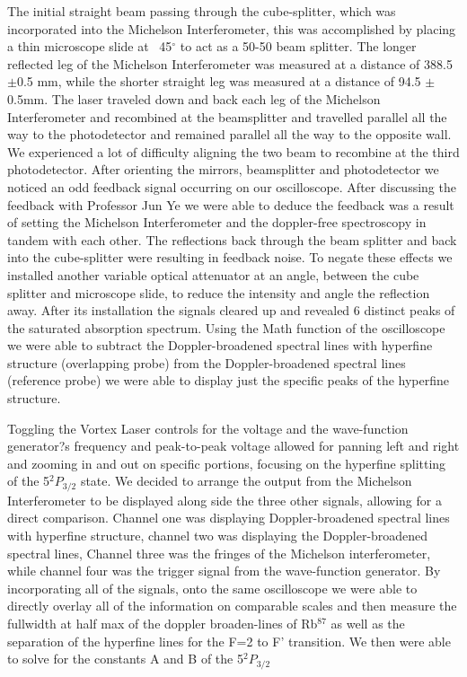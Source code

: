 \documentclass[12pt]{article}
\begin{document}
The initial straight beam passing through the cube-splitter, which was incorporated into the Michelson Interferometer, this was accomplished by placing a thin microscope slide at ~45$^{\circ}$ to act as a 50-50 beam splitter. The longer reflected leg of the Michelson Interferometer was measured at a distance of 388.5 $\pm $0.5 mm, while the shorter straight leg was measured at a distance of 94.5 $\pm $0.5mm. The laser traveled down and back each leg of the Michelson Interferometer and recombined at the beamsplitter and travelled parallel all the way to the photodetector and remained parallel all the way to the opposite wall. We experienced a lot of difficulty aligning the two beam to recombine at the third photodetector. After orienting the mirrors, beamsplitter and photodetector we noticed an odd feedback signal occurring on our oscilloscope. After discussing the feedback with Professor Jun Ye we were able to deduce the feedback was a result of setting the Michelson Interferometer and the doppler-free spectroscopy in tandem with each other. The reflections back through the beam splitter and back into the cube-splitter were resulting in feedback noise. To negate these effects we installed another variable optical attenuator at an angle, between the cube splitter and microscope slide, to reduce the intensity and angle the reflection away. After its installation the signals cleared up and revealed 6 distinct peaks of the saturated absorption spectrum. Using the Math function of the oscilloscope we were able to subtract the Doppler-broadened spectral lines with hyperfine structure (overlapping probe) from the Doppler-broadened spectral lines (reference probe) we were able to display just the specific peaks of the hyperfine structure. 

Toggling the Vortex Laser controls for the voltage and the wave-function generator?s frequency and peak-to-peak voltage allowed for panning left and right and zooming in and out on specific portions, focusing on the hyperfine splitting of the 5$^2P_{3/2} $ state.  We decided to arrange the output from the Michelson Interferometer to be displayed along side the three other signals, allowing for a direct comparison. Channel one was displaying Doppler-broadened spectral lines with hyperfine structure, channel two was displaying the Doppler-broadened spectral lines, Channel three was the fringes of the Michelson interferometer, while channel four was the trigger signal from the wave-function generator. By incorporating all of the signals, onto the same oscilloscope we were able to directly overlay all of the information on comparable scales and then measure the fullwidth at half max  of the doppler broaden-lines of Rb$^{87} $ as well as the separation of the hyperfine lines for the 
F=2 to F' transition. We then were able to solve for the constants A and B of the 5$^2 P_{3/2}$
\end{document}
